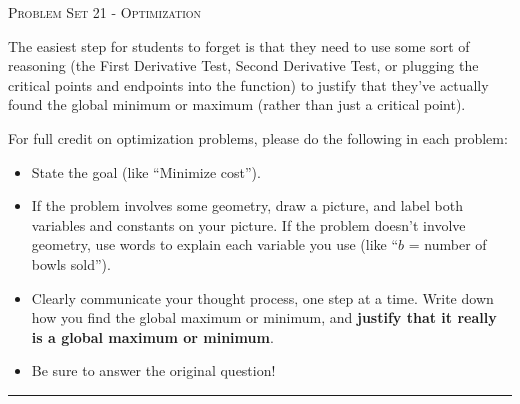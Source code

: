 \documentclass{article}
\begin{document}
\begin{center}
  \large\textsc{Problem Set 21 - Optimization}
\end{center}

\begin{workshop}
  The easiest step for students to forget is that they need to use some sort of reasoning (the First Derivative Test, Second Derivative Test, or plugging the critical points and endpoints into the function) to justify that they've actually found the global minimum or maximum (rather than just a critical point).
\end{workshop}

For full credit on optimization problems, please do the following in each problem:
{
  \begin{itemize}[nosep]
  \item State the goal (like ``Minimize cost'').
  \item If the problem involves some geometry, draw a picture, and label both variables and constants on your picture. If the problem doesn't involve geometry, use words to explain each variable you use (like ``$b$ = number of bowls sold'').
  \item Clearly communicate your thought process, one step at a time. Write down how you find the global maximum or minimum, and \textbf{justify that it really is a global maximum or minimum}. 
  \item Be sure to answer the original question!
  \end{itemize}
}

\begin{center}
  \rule{5in}{0.4pt}
\end{center}
\end{document}
